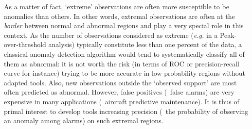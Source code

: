 As a matter of fact, `extreme' observations are often more susceptible to be anomalies than  others.
In other words, extremal observations are often at the \textit{border} between normal and abnormal regions and play a very special role in this context. As the number of observations considered as extreme (\emph{e.g.} in a Peak-over-threshold analysis) typically constitute less than one percent of the data, a classical anomaly detection algorithm would tend to systematically classify all of them as abnormal: it is not worth the risk (in terms of ROC or precision-recall curve for instance) trying to be more accurate in low probability regions without adapted tools. Also, new observations outside the `observed support' are most often predicted as abnormal. However, false positives (\ie~false alarms) are very expensive in many applications (\eg~aircraft predictive maintenance). It is thus of primal interest to develop tools increasing precision (\ie~the probability of observing an anomaly among alarms) on such extremal regions.

